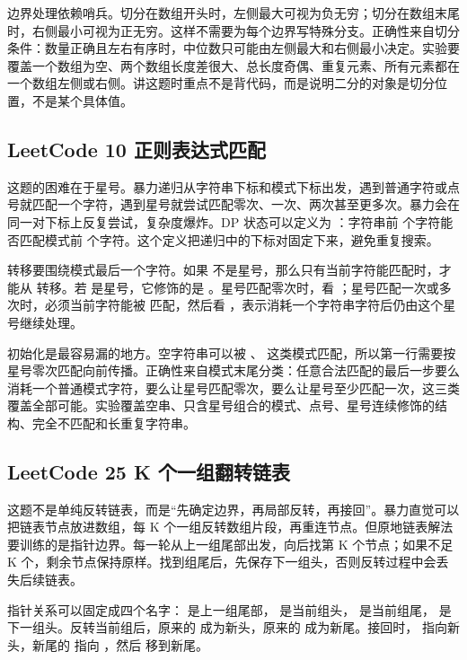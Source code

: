 边界处理依赖哨兵。切分在数组开头时，左侧最大可视为负无穷；切分在数组末尾时，右侧最小可视为正无穷。这样不需要为每个边界写特殊分支。正确性来自切分条件：数量正确且左右有序时，中位数只可能由左侧最大和右侧最小决定。实验要覆盖一个数组为空、两个数组长度差很大、总长度奇偶、重复元素、所有元素都在一个数组左侧或右侧。讲这题时重点不是背代码，而是说明二分的对象是切分位置，不是某个具体值。

\subsection{LeetCode 10 正则表达式匹配}

这题的困难在于星号。暴力递归从字符串下标和模式下标出发，遇到普通字符或点号就匹配一个字符，遇到星号就尝试匹配零次、一次、两次甚至更多次。暴力会在同一对下标上反复尝试，复杂度爆炸。DP 状态可以定义为 ：字符串前  个字符能否匹配模式前  个字符。这个定义把递归中的下标对固定下来，避免重复搜索。

转移要围绕模式最后一个字符。如果  不是星号，那么只有当前字符能匹配时，才能从  转移。若  是星号，它修饰的是 。星号匹配零次时，看 ；星号匹配一次或多次时，必须当前字符能被  匹配，然后看 ，表示消耗一个字符串字符后仍由这个星号继续处理。

初始化是最容易漏的地方。空字符串可以被 、 这类模式匹配，所以第一行需要按星号零次匹配向前传播。正确性来自模式末尾分类：任意合法匹配的最后一步要么消耗一个普通模式字符，要么让星号匹配零次，要么让星号至少匹配一次，这三类覆盖全部可能。实验覆盖空串、只含星号组合的模式、点号、星号连续修饰的结构、完全不匹配和长重复字符串。

\subsection{LeetCode 25 K 个一组翻转链表}

这题不是单纯反转链表，而是“先确定边界，再局部反转，再接回”。暴力直觉可以把链表节点放进数组，每 K 个一组反转数组片段，再重连节点。但原地链表解法要训练的是指针边界。每一轮从上一组尾部出发，向后找第 K 个节点；如果不足 K 个，剩余节点保持原样。找到组尾后，先保存下一组头，否则反转过程中会丢失后续链表。

指针关系可以固定成四个名字： 是上一组尾部， 是当前组头， 是当前组尾， 是下一组头。反转当前组后，原来的  成为新头，原来的  成为新尾。接回时， 指向新头，新尾的  指向 ，然后  移到新尾。

